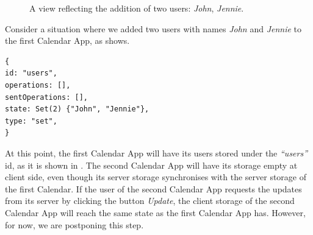 \begin{figure}[!htb]
    \begin{center}
    \setlength{\fboxsep}{4pt}%
    \setlength{\fboxrule}{1pt}%
    {\scriptsize%
     }
    \caption {A view reflecting the addition of two users: \textit{John}, \textit{Jennie}.}
    \label{fig:ev-fig-2}
\end{center}
\end{figure}

Consider a situation where we added two users with names \textit{John} and \textit{Jennie} to the first Calendar App, as  shows. 

\begin{lstlisting}[caption={The state of the users object store at the first Calendar App.}, label={lst:ev3}]
{
id: "users",
operations: [],
sentOperations: [],
state: Set(2) {"John", "Jennie"},
type: "set",
}
\end{lstlisting}

At this point, the first Calendar App will have its users stored under the \textit{``users''} id, as it is shown in . The second Calendar App will have its storage empty at client side, even though its server storage synchronises with the server storage of the first Calendar. If the user of the second Calendar App requests the updates from its server by clicking the button \textit{Update}, the client storage of the second Calendar App will reach the same state as the first Calendar App has. However, for now, we are postponing this step.

